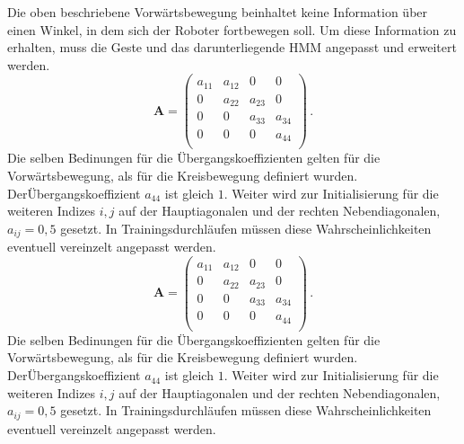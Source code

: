 Die oben beschriebene Vorw\"artsbewegung beinhaltet keine Information \"uber einen Winkel, in dem sich der Roboter fortbewegen soll. Um diese Information zu erhalten, muss die Geste und das darunterliegende \acrshort{HMM} angepasst und erweitert werden.
\newline
\begin{equation}
\mathbf{A} = 
\begin{pmatrix}
a_{11} & a_{12} & 0 & 0\\
0 & a_{22} & a_{23} & 0\\
0 & 0 & a_{33} & a_{34}\\
0 & 0 & 0 & a_{44} \\
\end{pmatrix} \, .
\end{equation}
Die selben Bedinungen f\"ur die \"Ubergangskoeffizienten gelten f\"ur die Vorw\"artsbewegung, als f\"ur die Kreisbewegung definiert wurden. 
\newline
Der\"Ubergangskoeffizient $a_{44}$ ist gleich $1$. Weiter wird zur Initialisierung f\"ur die weiteren Indizes $i, j$ auf der Hauptiagonalen und der rechten Nebendiagonalen, $a_{ij} = 0,5$ gesetzt. In Trainingsdurchl\"aufen m\"ussen diese Wahrscheinlichkeiten eventuell vereinzelt angepasst werden.\begin{equation}
\mathbf{A} = 
\begin{pmatrix}
a_{11} & a_{12} & 0 & 0\\
0 & a_{22} & a_{23} & 0\\
0 & 0 & a_{33} & a_{34}\\
0 & 0 & 0 & a_{44} \\
\end{pmatrix} \, .
\end{equation}
Die selben Bedinungen f\"ur die \"Ubergangskoeffizienten gelten f\"ur die Vorw\"artsbewegung, als f\"ur die Kreisbewegung definiert wurden. 
\newline
Der\"Ubergangskoeffizient $a_{44}$ ist gleich $1$. Weiter wird zur Initialisierung f\"ur die weiteren Indizes $i, j$ auf der Hauptiagonalen und der rechten Nebendiagonalen, $a_{ij} = 0,5$ gesetzt. In Trainingsdurchl\"aufen m\"ussen diese Wahrscheinlichkeiten eventuell vereinzelt angepasst werden.

